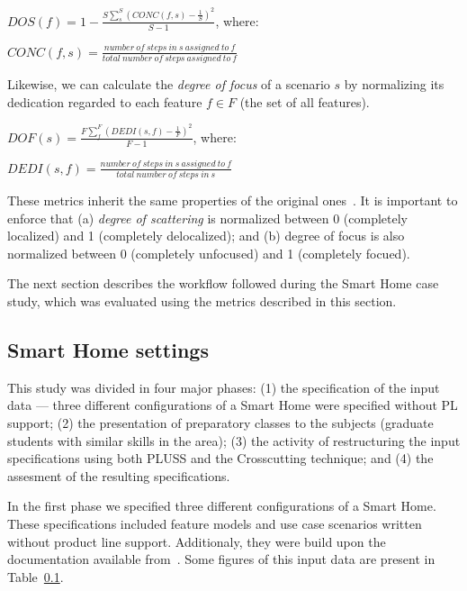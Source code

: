 \documentclass{acm_proc_article-sp}
\begin{document}
\begin{center}
$DOS(f) = 1 - \frac{S \sum_{s}^{S}(CONC(f,s)-\frac{1}{S})^2}{S-1}$, where:

$CONC(f,s) = \frac{number\ of\ steps\ in\ s\ assigned\ to\ f}{total\ number\
of\ steps\ assigned\ to\ f}$
\end{center}

Likewise, we can calculate the \emph{degree of focus} of a scenario $s$ by
normalizing its dedication regarded to each feature $f \in F$ (the set of
all features). 

\begin{center}
$DOF(s) = \frac{F \sum_{f}^{F}(DEDI(s,f)-\frac{1}{F})^2}{F-1}$, where:

$DEDI(s,f) = \frac{number\ of\ steps\ in\ s\ assigned\ to\ f}{total\ number\
of\ steps\ in\ s}$
\end{center}

These metrics inherit the same properties of the original
ones~\cite{Eaddy:2007aa}. It is important to enforce that (a) \emph{degree
of scattering} is normalized between 0 (completely localized) and 1 (completely
delocalized); and (b) degree of focus is also normalized between 0 (completely
unfocused) and 1 (completely focued). 

The next section describes the workflow followed during the Smart Home
case study, which was evaluated using the metrics described in this section.

\subsection{Smart Home settings}

This study was divided in four major phases: (1) the specification of the input
data --- three different configurations of a Smart Home were specified without
PL support; (2) the presentation of preparatory classes to the subjects
(graduate students with similar skills in the area); (3) the activity of
restructuring the input specifications using both PLUSS and the Crosscutting
technique; and (4) the assesment of the resulting specifications.

In the first phase we specified three different configurations of a Smart
Home. These specifications included feature models and use case
scenarios written without product line support. Additionaly, they were build
upon the documentation available from~\cite{Pohl:2005aa,Mauricio,AMPLE}. Some
figures of this input data are present in Table~\ref{}.
\end{document}
